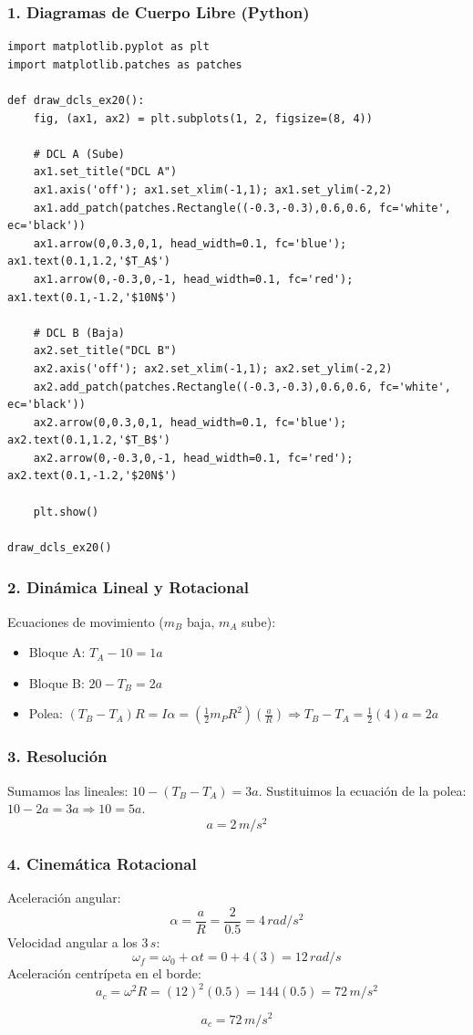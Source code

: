 \documentclass[12pt, a4paper]{article}
\begin{document}
\subsubsection*{1. Diagramas de Cuerpo Libre (Python)}
\begin{lstlisting}
import matplotlib.pyplot as plt
import matplotlib.patches as patches

def draw_dcls_ex20():
    fig, (ax1, ax2) = plt.subplots(1, 2, figsize=(8, 4))
    
    # DCL A (Sube)
    ax1.set_title("DCL A")
    ax1.axis('off'); ax1.set_xlim(-1,1); ax1.set_ylim(-2,2)
    ax1.add_patch(patches.Rectangle((-0.3,-0.3),0.6,0.6, fc='white', ec='black'))
    ax1.arrow(0,0.3,0,1, head_width=0.1, fc='blue'); ax1.text(0.1,1.2,'$T_A$')
    ax1.arrow(0,-0.3,0,-1, head_width=0.1, fc='red'); ax1.text(0.1,-1.2,'$10N$')
    
    # DCL B (Baja)
    ax2.set_title("DCL B")
    ax2.axis('off'); ax2.set_xlim(-1,1); ax2.set_ylim(-2,2)
    ax2.add_patch(patches.Rectangle((-0.3,-0.3),0.6,0.6, fc='white', ec='black'))
    ax2.arrow(0,0.3,0,1, head_width=0.1, fc='blue'); ax2.text(0.1,1.2,'$T_B$')
    ax2.arrow(0,-0.3,0,-1, head_width=0.1, fc='red'); ax2.text(0.1,-1.2,'$20N$')
    
    plt.show()

draw_dcls_ex20()
\end{lstlisting}

\subsubsection*{2. Dinámica Lineal y Rotacional}
Ecuaciones de movimiento ($m_B$ baja, $m_A$ sube):
\begin{itemize}
    \item Bloque A: $T_A - 10 = 1 a$
    \item Bloque B: $20 - T_B = 2 a$
    \item Polea: $(T_B - T_A)R = I \alpha = (\frac{1}{2}m_P R^2) (\frac{a}{R}) \Rightarrow T_B - T_A = \frac{1}{2}(4)a = 2a$
\end{itemize}

\subsubsection*{3. Resolución}
Sumamos las lineales: $10 - (T_B - T_A) = 3a$.
Sustituimos la ecuación de la polea: $10 - 2a = 3a \Rightarrow 10 = 5a$.
$$ a = 2 \, \si{m/s^2} $$

\subsubsection*{4. Cinemática Rotacional}
Aceleración angular:
$$ \alpha = \frac{a}{R} = \frac{2}{0.5} = 4 \, \si{rad/s^2} $$
Velocidad angular a los $3 \, \si{s}$:
$$ \omega_f = \omega_0 + \alpha t = 0 + 4(3) = 12 \, \si{rad/s} $$
Aceleración centrípeta en el borde:
$$ a_c = \omega^2 R = (12)^2 (0.5) = 144(0.5) = 72 \, \si{m/s^2} $$

\begin{tcolorbox}[colback=green!5!white, colframe=green!50!black, title=Respuesta Final]
$$ a_c = 72 \, \si{m/s^2} $$
\end{tcolorbox}
\end{document}
